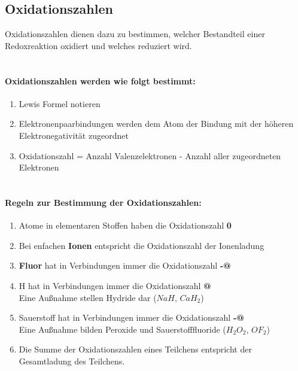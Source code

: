 \documentclass[a4paper]{article}
\makeatletter
\newcommand*{\rom}[1]{\expandafter\@slowromancap\romannumeral #1@}
\makeatother
\begin{document}
\subsection{Oxidationszahlen}
Oxidationszahlen dienen dazu zu bestimmen, welcher Bestandteil einer Redoxreaktion oxidiert und welches reduziert wird.\\\\

\paragraph{Oxidationszahlen werden wie folgt bestimmt:}
\begin{enumerate}
    \item Lewis Formel notieren
    \item Elektronenpaarbindungen werden dem Atom der Bindung mit der höheren Elektronegativität zugeordnet
    \item Oxidationszahl = Anzahl Valenzelektronen - Anzahl aller zugeordneten Elektronen\\\\
\end{enumerate}


\paragraph{Regeln zur Bestimmung der Oxidationszahlen:}
\begin{enumerate}
    \item Atome in elementaren Stoffen haben die Oxidationszahl \textbf{0}
    \item Bei enfachen \textbf{Ionen} entspricht die Oxidationszahl der Ionenladung
    \item \textbf{Fluor} hat in Verbindungen immer die Oxidationszahl \textbf{-\rom{1}}
    \item H hat in Verbindungen immer die Oxidationszahl \textbf{\rom{1}}\\
            Eine Außnahme stellen Hydride dar ($NaH$, $CaH_2$)
    \item Sauerstoff hat in Verbindungen immer die Oxidationszahl \textbf{-\rom{2}}\\
            Eine Außnahme bilden Peroxide und Sauerstofffluoride ($H_2O_2$, $OF_2$)
    \item Die Summe der Oxidationszahlen eines Teilchens entspricht der Gesamtladung des Teilchens.
\end{enumerate}
\end{document}
